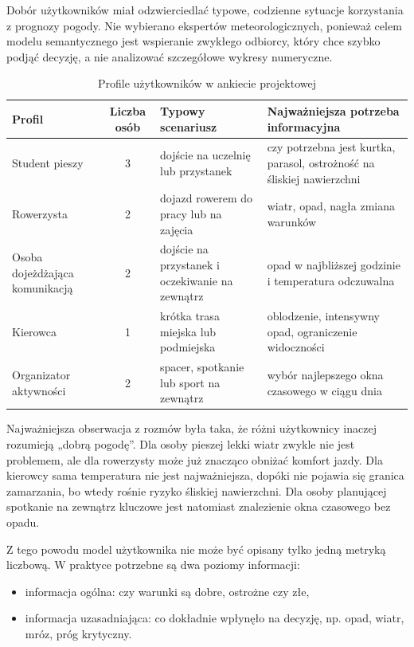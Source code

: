 \documentclass[a4paper,12pt]{article}
\begin{document}
Dobór użytkowników miał odzwierciedlać typowe, codzienne sytuacje korzystania z
prognozy pogody. Nie wybierano ekspertów meteorologicznych, ponieważ celem
modelu semantycznego jest wspieranie zwykłego odbiorcy, który chce szybko
podjąć decyzję, a nie analizować szczegółowe wykresy numeryczne.

\begin{table}[h]
\centering
\caption{Profile użytkowników w ankiecie projektowej}
\small
\begin{tabularx}{\textwidth}{p{3.2cm}cp{4.2cm}X}
\toprule
Profil & Liczba osób & Typowy scenariusz & Najważniejsza potrzeba informacyjna \\
\midrule
Student pieszy & 3 & dojście na uczelnię lub przystanek & czy potrzebna jest kurtka, parasol, ostrożność na śliskiej nawierzchni \\
Rowerzysta & 2 & dojazd rowerem do pracy lub na zajęcia & wiatr, opad, nagła zmiana warunków \\
Osoba dojeżdżająca komunikacją & 2 & dojście na przystanek i oczekiwanie na zewnątrz & opad w najbliższej godzinie i temperatura odczuwalna \\
Kierowca & 1 & krótka trasa miejska lub podmiejska & oblodzenie, intensywny opad, ograniczenie widoczności \\
Organizator aktywności & 2 & spacer, spotkanie lub sport na zewnątrz & wybór najlepszego okna czasowego w ciągu dnia \\
\bottomrule
\end{tabularx}
\normalsize
\end{table}

\noindent
Najważniejsza obserwacja z rozmów była taka, że różni użytkownicy inaczej
rozumieją „dobrą pogodę”. Dla osoby pieszej lekki wiatr zwykle nie jest
problemem, ale dla rowerzysty może już znacząco obniżać komfort jazdy. Dla
kierowcy sama temperatura nie jest najważniejsza, dopóki nie pojawia się
granica zamarzania, bo wtedy rośnie ryzyko śliskiej nawierzchni. Dla osoby
planującej spotkanie na zewnątrz kluczowe jest natomiast znalezienie okna
czasowego bez opadu.

\noindent
Z tego powodu model użytkownika nie może być opisany tylko jedną metryką
liczbową. W praktyce potrzebne są dwa poziomy informacji:
\begin{itemize}
    \item informacja ogólna: czy warunki są dobre, ostrożne czy złe,
    \item informacja uzasadniająca: co dokładnie wpłynęło na decyzję, np. opad, wiatr, mróz, próg krytyczny.
\end{itemize}
\end{document}
